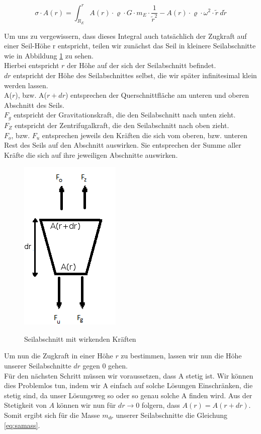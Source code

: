 \documentclass[a4paper, 10pt]{report}
\begin{document}
\begin{equation}
\sigma \cdot A(r) = \int_{R_E}^{r} A(r) \cdot \varrho \cdot G \cdot m_E \cdot \frac{1}{\tilde{r}^2} - A(r) \cdot \varrho \cdot \omega^2 \cdot \tilde{r}\ d\tilde{r}
\label{eq:taperint}
\end{equation}

Um uns zu vergewissern, dass dieses Integral auch tatsächlich der Zugkraft auf einer Seil-Höhe r entspricht, teilen wir zunächst das Seil in kleinere Seilabschnitte wie in Abbildung \ref{fig:differential} zu sehen.\\
Hierbei entspricht $r$ der Höhe auf der sich der Seilabschnitt befindet.\\
$dr$ entspricht der Höhe des Seilabschnittes selbst, die wir später infinitesimal klein werden lassen.\\
A($r$), bzw. A($r+dr$) entsprechen der Querschnittfläche am unteren und oberen Abschnitt des Seils.\\
$F_g$ entspricht der Gravitationskraft, die den Seilabschnitt nach unten zieht.\\
$F_Z$ entspricht der Zentrifugalkraft, die den Seilabschnitt nach oben zieht.\\
$F_o$, bzw. $F_u$ entsprechen jeweils den Kräften die sich vom oberen, bzw. unteren Rest des Seils auf den Abschnitt auswirken. Sie entsprechen der Summe aller Kräfte die sich auf ihre jeweiligen Abschnitte auswirken.

\begin{figure}[!htb]
	\centering
	\includegraphics{differential}
	\label{fig:differential}
	\caption{Seilabschnitt mit wirkenden Kräften}
\end{figure}

Um nun die Zugkraft in einer Höhe $r$ zu bestimmen, lassen wir nun die Höhe unserer Seilabschnitte $dr$ gegen 0 gehen.\\
Für den nächsten Schritt müssen wir voraussetzen, dass A stetig ist. Wir können dies Problemlos tun, indem wir A einfach auf solche Lösungen Einschränken, die stetig sind, da unser Lösungsweg so oder so genau solche A finden wird. Aus der Stetigkeit von $A$ können wir nun für $dr \rightarrow 0$ folgern, dass $A(r)=A(r+dr)$. Somit ergibt sich für die Masse $m_{dr}$ unserer Seilabschnitte die Gleichung \ref{eq:samass}.
\end{document}
